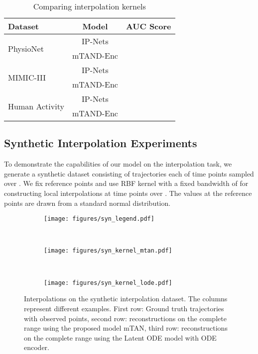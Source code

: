 \documentclass{article} \usepackage{iclr2021_conference,times}
\begin{document}
\begin{table}[h]
\centering
    \caption{Comparing interpolation kernels}
    \label{table:kernel}
        \begin{tabular}[h]{l c c}
         \toprule
 {\bf Dataset} &   {\bf Model} &      {\bf AUC Score} \\
         \midrule
 \multirow{2}{*}{PhysioNet} & {IP-Nets} &          \\
 & {mTAND-Enc} &           \\
 \midrule
 \multirow{2}{*}{MIMIC-III} & {IP-Nets} &          \\
 & {mTAND-Enc} &           \\
 \midrule
 \multirow{2}{*}{Human Activity} & {IP-Nets} &          \\
 & {mTAND-Enc} &           \\
\bottomrule
\end{tabular}  
\end{table}


\subsection{Synthetic Interpolation Experiments}
\label{sec:synthetic_data}
To demonstrate the capabilities of our model on the interpolation task, we generate a synthetic dataset consisting of  trajectories each of  time points sampled over . We fix  reference points and use RBF kernel with a fixed bandwidth of  for constructing local interpolations at  time points over . The values at the reference points are drawn from a standard normal distribution. 

\begin{figure}[t]
\centering
\begin{subfigure}[b]{0.75\textwidth}
   \texttt{[image: figures/syn\_legend.pdf]}
\end{subfigure}\\
\begin{subfigure}[b]{\textwidth}
\texttt{[image: figures/syn\_kernel\_mtan.pdf]}
\end{subfigure}\\
\begin{subfigure}[b]{\textwidth}
\texttt{[image: figures/syn\_kernel\_lode.pdf]}
\end{subfigure}
\caption{Interpolations on the synthetic interpolation dataset. The columns represent  different examples. First row: Ground truth trajectories with observed points, second row: reconstructions on the complete range  using the proposed model mTAN, third row: reconstructions on the complete range  using the Latent ODE model with ODE encoder.}
\label{fig:toy}
\end{figure}
\end{document}

